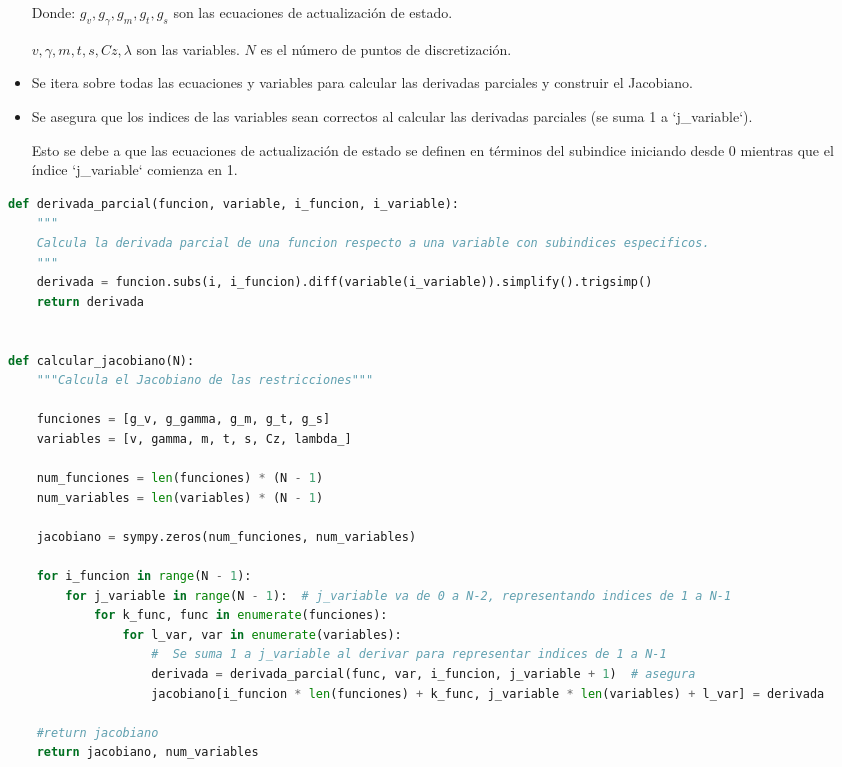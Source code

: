 \documentclass[fleqn]{article}
\begin{document}
\begin{itemize}
    Donde: $g_v, g_\gamma, g_m, g_t, g_s$ son las ecuaciones de actualización de estado.
    
    $v, \gamma, m, t, s, Cz, \lambda$ son las variables. $N$ es el número de puntos de discretización.
        
    \item Se itera sobre todas las ecuaciones y variables para calcular las derivadas parciales y construir el Jacobiano.
    
    \item Se asegura que los indices de las variables sean correctos al calcular las derivadas parciales (se suma 1 a `j\_variable`). 
    
    Esto se debe a que las ecuaciones de actualización de estado se definen en términos del subindice iniciando desde 0 mientras que el índice `j\_variable` comienza en 1.


\end{itemize}

\begin{lstlisting}[language=Python, firstnumber=last, style = mystyle]
def derivada_parcial(funcion, variable, i_funcion, i_variable):
    """
    Calcula la derivada parcial de una funcion respecto a una variable con subindices especificos.
    """
    derivada = funcion.subs(i, i_funcion).diff(variable(i_variable)).simplify().trigsimp()
    return derivada


def calcular_jacobiano(N):
    """Calcula el Jacobiano de las restricciones"""

    funciones = [g_v, g_gamma, g_m, g_t, g_s]
    variables = [v, gamma, m, t, s, Cz, lambda_]

    num_funciones = len(funciones) * (N - 1)
    num_variables = len(variables) * (N - 1)

    jacobiano = sympy.zeros(num_funciones, num_variables)

    for i_funcion in range(N - 1):
        for j_variable in range(N - 1):  # j_variable va de 0 a N-2, representando indices de 1 a N-1
            for k_func, func in enumerate(funciones):
                for l_var, var in enumerate(variables):
                    #  Se suma 1 a j_variable al derivar para representar indices de 1 a N-1
                    derivada = derivada_parcial(func, var, i_funcion, j_variable + 1)  # asegura
                    jacobiano[i_funcion * len(funciones) + k_func, j_variable * len(variables) + l_var] = derivada

    #return jacobiano
    return jacobiano, num_variables
\end{lstlisting}
\end{document}
